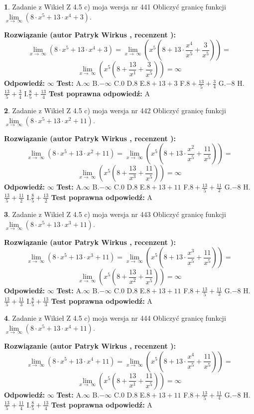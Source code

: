 \documentclass[12pt, a4paper]{article}
\theoremstyle{definition} %
\newtheorem{zad}{}
\newcommand{\zadStart}[1]{\begin{zad}#1\newline}
\newcommand{\zadStop}{\end{zad}}
\newcommand{\rozwStart}[2]{\noindent \textbf{Rozwiązanie (autor #1 , recenzent #2): }\newline}
\newcommand{\rozwStop}{\newline}
\newcommand{\odpStart}{\noindent \textbf{Odpowiedź:}\newline}
\newcommand{\odpStop}{\newline}
\newcommand{\testStart}{\noindent \textbf{Test:}\newline}
\newcommand{\testStop}{\newline}
\newcommand{\kluczStart}{\noindent \textbf{Test poprawna odpowiedź:}\newline}
\newcommand{\kluczStop}{\newline}
\begin{document}
\zadStart{Zadanie z Wikieł Z 4.5 c) moja wersja nr 441}
Obliczyć granicę funkcji  $\lim\limits_{x\to\ \infty}(8 \cdot x^{5}+13 \cdot x^{4}+3)$.
\zadStop
\rozwStart{Patryk Wirkus}{}
$$\lim\limits_{x\to\ \infty}(8 \cdot x^{5}+13 \cdot x^{4}+3) = \lim\limits_{x\to\ \infty}(x^{5}(8 +13 \cdot \frac{x^{4}}{x^{5}}+\frac{3}{x^{5}})) =$$ $$\lim\limits_{x\to\ \infty}(x^{5}(8 +\frac{13}{x^{1}}+\frac{3}{x^{5}})) =\infty$$
\rozwStop
\odpStart
$\infty$
\odpStop
\testStart
A.$\infty$ B.$-\infty$ C.$0$ D.$8$ E.$8 + 13 + 3$
F.$8+\frac{13}{5}+\frac{3}{4}$ G.$-8$
H.$\frac{13}{5}+\frac{3}{4}$
I.$\frac{8}{5}+\frac{13}{4}$
\testStop
\kluczStart
A
\kluczStop



\zadStart{Zadanie z Wikieł Z 4.5 c) moja wersja nr 442}
Obliczyć granicę funkcji  $\lim\limits_{x\to\ \infty}(8 \cdot x^{5}+13 \cdot x^{2}+11)$.
\zadStop
\rozwStart{Patryk Wirkus}{}
$$\lim\limits_{x\to\ \infty}(8 \cdot x^{5}+13 \cdot x^{2}+11) = \lim\limits_{x\to\ \infty}(x^{5}(8 +13 \cdot \frac{x^{2}}{x^{5}}+\frac{11}{x^{5}})) =$$ $$\lim\limits_{x\to\ \infty}(x^{5}(8 +\frac{13}{x^{3}}+\frac{11}{x^{5}})) =\infty$$
\rozwStop
\odpStart
$\infty$
\odpStop
\testStart
A.$\infty$ B.$-\infty$ C.$0$ D.$8$ E.$8 + 13 + 11$
F.$8+\frac{13}{5}+\frac{11}{2}$ G.$-8$
H.$\frac{13}{5}+\frac{11}{2}$
I.$\frac{8}{5}+\frac{13}{2}$
\testStop
\kluczStart
A
\kluczStop



\zadStart{Zadanie z Wikieł Z 4.5 c) moja wersja nr 443}
Obliczyć granicę funkcji  $\lim\limits_{x\to\ \infty}(8 \cdot x^{5}+13 \cdot x^{3}+11)$.
\zadStop
\rozwStart{Patryk Wirkus}{}
$$\lim\limits_{x\to\ \infty}(8 \cdot x^{5}+13 \cdot x^{3}+11) = \lim\limits_{x\to\ \infty}(x^{5}(8 +13 \cdot \frac{x^{3}}{x^{5}}+\frac{11}{x^{5}})) =$$ $$\lim\limits_{x\to\ \infty}(x^{5}(8 +\frac{13}{x^{2}}+\frac{11}{x^{5}})) =\infty$$
\rozwStop
\odpStart
$\infty$
\odpStop
\testStart
A.$\infty$ B.$-\infty$ C.$0$ D.$8$ E.$8 + 13 + 11$
F.$8+\frac{13}{5}+\frac{11}{3}$ G.$-8$
H.$\frac{13}{5}+\frac{11}{3}$
I.$\frac{8}{5}+\frac{13}{3}$
\testStop
\kluczStart
A
\kluczStop



\zadStart{Zadanie z Wikieł Z 4.5 c) moja wersja nr 444}
Obliczyć granicę funkcji  $\lim\limits_{x\to\ \infty}(8 \cdot x^{5}+13 \cdot x^{4}+11)$.
\zadStop
\rozwStart{Patryk Wirkus}{}
$$\lim\limits_{x\to\ \infty}(8 \cdot x^{5}+13 \cdot x^{4}+11) = \lim\limits_{x\to\ \infty}(x^{5}(8 +13 \cdot \frac{x^{4}}{x^{5}}+\frac{11}{x^{5}})) =$$ $$\lim\limits_{x\to\ \infty}(x^{5}(8 +\frac{13}{x^{1}}+\frac{11}{x^{5}})) =\infty$$
\rozwStop
\odpStart
$\infty$
\odpStop
\testStart
A.$\infty$ B.$-\infty$ C.$0$ D.$8$ E.$8 + 13 + 11$
F.$8+\frac{13}{5}+\frac{11}{4}$ G.$-8$
H.$\frac{13}{5}+\frac{11}{4}$
I.$\frac{8}{5}+\frac{13}{4}$
\testStop
\kluczStart
A
\kluczStop
\end{document}
